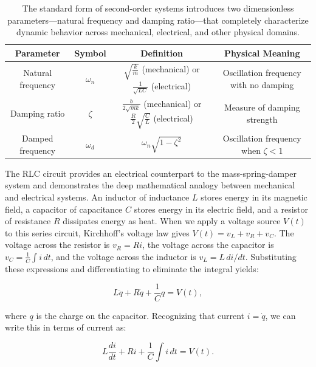 \begin{table}[h]
\centering
\begin{tabular}{|c|c|c|c|}
\hline
\textbf{Parameter} & \textbf{Symbol} & \textbf{Definition} & \textbf{Physical Meaning} \\
\hline
Natural frequency & $\omega_n$ & $\sqrt{\frac{k}{m}}$ (mechanical) or $\frac{1}{\sqrt{LC}}$ (electrical) & Oscillation frequency with no damping \\
\hline
Damping ratio & $\zeta$ & $\frac{b}{2\sqrt{mk}}$ (mechanical) or $\frac{R}{2}\sqrt{\frac{C}{L}}$ (electrical) & Measure of damping strength \\
\hline
Damped frequency & $\omega_d$ & $\omega_n \sqrt{1-\zeta^2}$ & Oscillation frequency when $\zeta < 1$ \\
\hline
\end{tabular}
\vspace{0.5cm}
\caption{The standard form of second-order systems introduces two dimensionless parameters—natural frequency and damping ratio—that completely characterize dynamic behavior across mechanical, electrical, and other physical domains.}
\label{tab:second_order_params}
\end{table}

The RLC circuit provides an electrical counterpart to the mass-spring-damper system and demonstrates the deep mathematical analogy between mechanical and electrical systems. An inductor of inductance $L$ stores energy in its magnetic field, a capacitor of capacitance $C$ stores energy in its electric field, and a resistor of resistance $R$ dissipates energy as heat. When we apply a voltage source $V(t)$ to this series circuit, Kirchhoff's voltage law gives $V(t) = v_L + v_R + v_C$. The voltage across the resistor is $v_R = R i$, the voltage across the capacitor is $v_C = \frac{1}{C} \int i \, dt$, and the voltage across the inductor is $v_L = L \, di/dt$. Substituting these expressions and differentiating to eliminate the integral yields:

\begin{equation}
L \ddot{q} + R \dot{q} + \frac{1}{C} q = V(t),
\end{equation}

where $q$ is the charge on the capacitor. Recognizing that current $i = \dot{q}$, we can write this in terms of current as:

\begin{equation}
L \frac{di}{dt} + R i + \frac{1}{C} \int i \, dt = V(t).
\end{equation}

